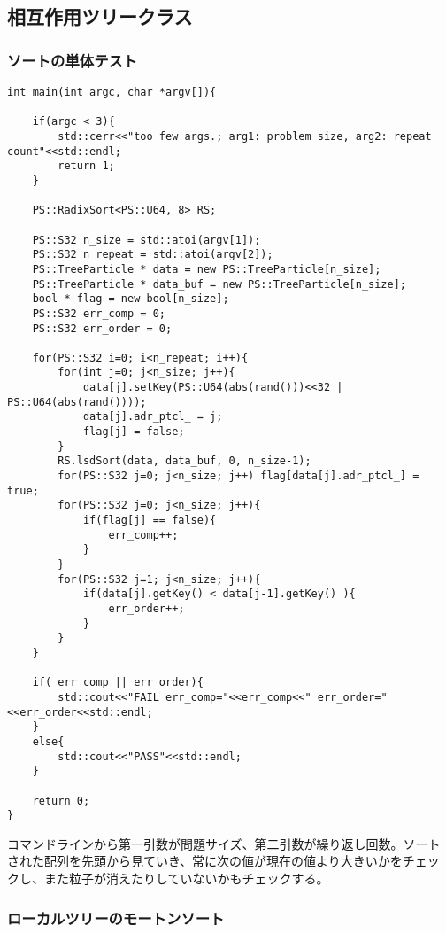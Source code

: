 \subsection{相互作用ツリークラス}

\subsubsection{ソートの単体テスト}

\begin{lstlisting}[caption=radix sortのテスト]
int main(int argc, char *argv[]){

    if(argc < 3){
        std::cerr<<"too few args.; arg1: problem size, arg2: repeat count"<<std::endl;
        return 1;
    }

    PS::RadixSort<PS::U64, 8> RS;

    PS::S32 n_size = std::atoi(argv[1]);
    PS::S32 n_repeat = std::atoi(argv[2]);
    PS::TreeParticle * data = new PS::TreeParticle[n_size];
    PS::TreeParticle * data_buf = new PS::TreeParticle[n_size];
    bool * flag = new bool[n_size];
    PS::S32 err_comp = 0;
    PS::S32 err_order = 0;

    for(PS::S32 i=0; i<n_repeat; i++){
        for(int j=0; j<n_size; j++){
            data[j].setKey(PS::U64(abs(rand()))<<32 | PS::U64(abs(rand())));
            data[j].adr_ptcl_ = j;
            flag[j] = false;
        }
        RS.lsdSort(data, data_buf, 0, n_size-1);
        for(PS::S32 j=0; j<n_size; j++) flag[data[j].adr_ptcl_] = true;
        for(PS::S32 j=0; j<n_size; j++){
            if(flag[j] == false){
                err_comp++;
            }
        }
        for(PS::S32 j=1; j<n_size; j++){
            if(data[j].getKey() < data[j-1].getKey() ){
                err_order++;
            }
        }
    }

    if( err_comp || err_order){
        std::cout<<"FAIL err_comp="<<err_comp<<" err_order="<<err_order<<std::endl;
    }
    else{
        std::cout<<"PASS"<<std::endl;
    }

    return 0;
}
\end{lstlisting}

コマンドラインから第一引数が問題サイズ、第二引数が繰り返し回数。ソート
された配列を先頭から見ていき、常に次の値が現在の値より大きいかをチェッ
クし、また粒子が消えたりしていないかもチェックする。


\subsubsection{ローカルツリーのモートンソート}

